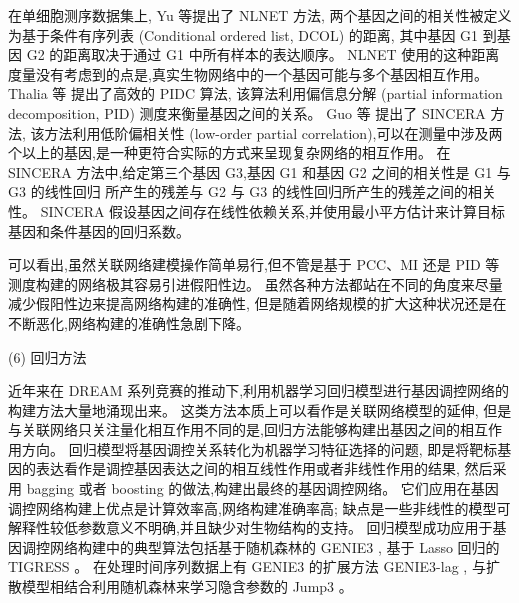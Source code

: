 在单细胞测序数据集上,
Yu 等提出了 NLNET 方法\cite{yu2013hierarchical}, 
两个基因之间的相关性被定义为基于条件有序列表 (Conditional ordered list, DCOL) 的距离,
其中基因 G1 到基因 G2 的距离取决于通过 G1 中所有样本的表达顺序。
NLNET 使用的这种距离度量没有考虑到的点是,真实生物网络中的一个基因可能与多个基因相互作用。
Thalia 等 \cite{chan2017gene} 提出了高效的 PIDC 算法,
该算法利用偏信息分解 (partial information decomposition, PID) 测度来衡量基因之间的关系。
Guo 等 \cite{guo2015sincera} 提出了 SINCERA 方法, 该方法利用低阶偏相关性 (low-order partial correlation),可以在测量中涉及两个以上的基因,是一种更符合实际的方式来呈现复杂网络的相互作用。
在 SINCERA 方法中,给定第三个基因 G3,基因 G1 和基因 G2 之间的相关性是 G1 与 G3 的线性回归
所产生的残差与 G2 与 G3 的线性回归所产生的残差之间的相关性。
SINCERA 假设基因之间存在线性依赖关系,并使用最小平方估计来计算目标基因和条件基因的回归系数。

可以看出,虽然关联网络建模操作简单易行,但不管是基于 PCC、MI 还是 PID 等测度构建的网络极其容易引进假阳性边。
虽然各种方法都站在不同的角度来尽量减少假阳性边来提高网络构建的准确性,
但是随着网络规模的扩大这种状况还是在不断恶化,网络构建的准确性急剧下降。

(6) 回归方法

近年来在 DREAM 系列竞赛的推动下,利用机器学习回归模型进行基因调控网络的构建方法大量地涌现出来。
这类方法本质上可以看作是关联网络模型的延伸,
但是与关联网络只关注量化相互作用不同的是,回归方法能够构建出基因之间的相互作用方向。
回归模型将基因调控关系转化为机器学习特征选择的问题,
即是将靶标基因的表达看作是调控基因表达之间的相互线性作用或者非线性作用的结果,
然后采用 bagging 或者 boosting 的做法,构建出最终的基因调控网络。
它们应用在基因调控网络构建上优点是计算效率高,网络构建准确率高;
缺点是一些非线性的模型可解释性较低参数意义不明确,并且缺少对生物结构的支持。
回归模型成功应用于基因调控网络构建中的典型算法包括基于随机森林的 GENIE3 \cite{Huynh-Thu2010},
基于 Lasso 回归的 TIGRESS \cite{Haury2012}。
在处理时间序列数据上有 GENIE3 的扩展方法 GENIE3-lag \cite{huynh2012machine},
与扩散模型相结合利用随机森林来学习隐含参数的 Jump3 \cite{Huynh-Thu2014}。

